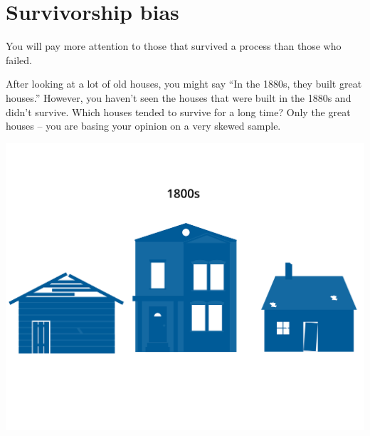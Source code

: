 \section{Survivorship bias}

You will pay more attention to those that survived a process than
those who failed.

After looking at a lot of old houses, you might say ``In the 1880s,
they built great houses.'' However, you haven't seen the houses that
were built in the 1880s and didn't survive. Which houses tended to
survive for a long time? Only the great houses -- you are
basing your opinion on a very skewed sample.

\includegraphics[width=1\textwidth]{survivorshipBias.png}


